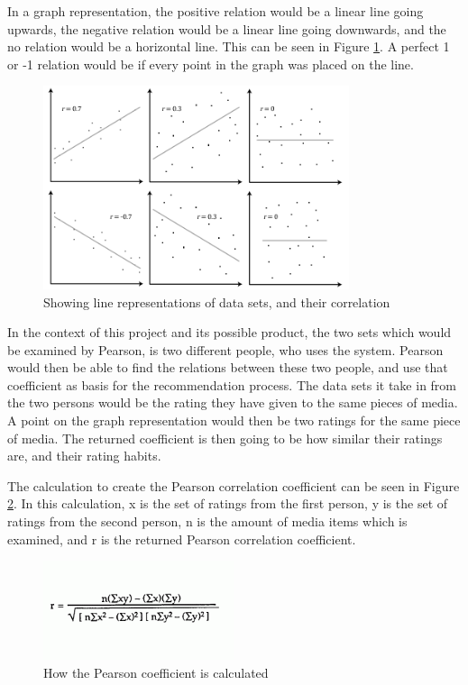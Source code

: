 In a graph representation, the positive relation would be a linear line going upwards, the negative relation would be a linear line going downwards, and the no relation would be a horizontal line. This can be seen in Figure \ref{Pearson1}. A perfect 1 or -1 relation would be if every point in the graph was placed on the line. \cite{Pearson1}

\begin{figure}[H]
\centering
\includegraphics[width=0.8\textwidth]{Images/pearson1.png}
\caption{Showing line representations of data sets, and their correlation \cite{Pearson2}}
\label{Pearson1}
\end{figure}

In the context of this project and its possible product, the two sets which would be examined by Pearson, is two different people, who uses the system. Pearson would then be able to find the relations between these two people, and use that coefficient as basis for the recommendation process. The data sets it take in from the two persons would be the rating they have given to the same pieces of media. A point on the graph representation would then be two ratings for the same piece of media. The returned coefficient is then going to be how similar their ratings are, and their rating habits.

The calculation to create the Pearson correlation coefficient can be seen in Figure \ref{PearsonCalc}. In this calculation, x is the set of ratings from the first person, y is the set of ratings from the second person, n is the amount of media items which is examined, and r is the returned Pearson correlation coefficient. \cite{Pearson1}

\begin{figure}[htb]
\centering
\includegraphics[width=0.5\textwidth]{Images/pearsonCalc.png}
\caption{How the Pearson coefficient is calculated \cite{Pearson1}}
\label{PearsonCalc}
\end{figure}


